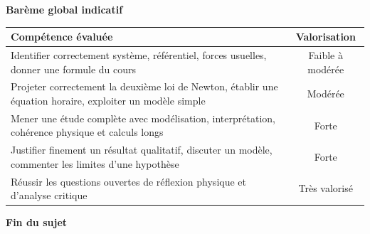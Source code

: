 \documentclass[11pt,a4paper]{article}
\begin{document}
\begin{center}
\textbf{\large Barème global indicatif}
\end{center}

\begin{center}
\renewcommand{\arraystretch}{1.25}
\begin{tabular}{|>{\raggedright\arraybackslash}p{9.8cm}|c|}
\hline
\textbf{Compétence évaluée} & \textbf{Valorisation} \\
\hline
Identifier correctement système, référentiel, forces usuelles, donner une formule du cours & Faible à modérée \\
\hline
Projeter correctement la deuxième loi de Newton, établir une équation horaire, exploiter un modèle simple & Modérée \\
\hline
Mener une étude complète avec modélisation, interprétation, cohérence physique et calculs longs & Forte \\
\hline
Justifier finement un résultat qualitatif, discuter un modèle, commenter les limites d’une hypothèse & Forte \\
\hline
Réussir les questions ouvertes de réflexion physique et d’analyse critique & Très valorisé \\
\hline
\end{tabular}
\end{center}

\vfill

\begin{center}
\textbf{Fin du sujet}
\end{center}
\end{document}
